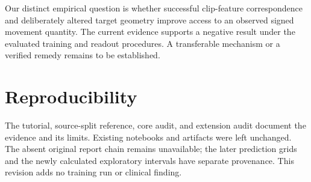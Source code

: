 \documentclass{article}
\begin{document}
Our distinct empirical question is whether successful clip-feature correspondence and deliberately altered target geometry improve access to an observed signed movement quantity. The current evidence supports a negative result under the evaluated training and readout procedures. A transferable mechanism or a verified remedy remains to be established.

\section{Reproducibility}\label{reproducibility}

The {tutorial}, {source-split reference}, {core audit}, and {extension audit} document the evidence and its limits. Existing notebooks and artifacts were left unchanged. The absent original report chain remains unavailable; the later prediction grids and the newly calculated exploratory intervals have separate provenance. This revision adds no training run or clinical finding.
\label{physworld:main-last}
\clearpage
\label{physworld:references-start}
\end{document}
